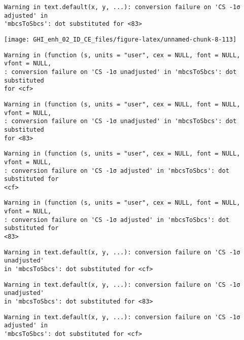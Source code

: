 \documentclass[
  10pt,
  a4paper,oneside]{article}
\begin{document}
\begin{verbatim}
Warning in text.default(x, y, ...): conversion failure on 'CS -1σ adjusted' in
'mbcsToSbcs': dot substituted for <83>
\end{verbatim}

\begin{center}\texttt{[image: GHI\_enh\_02\_ID\_CE\_files/figure-latex/unnamed-chunk-8-113]} \end{center}

\begin{verbatim}
Warning in (function (s, units = "user", cex = NULL, font = NULL, vfont = NULL,
: conversion failure on 'CS -1σ unadjusted' in 'mbcsToSbcs': dot substituted
for <cf>
\end{verbatim}

\begin{verbatim}
Warning in (function (s, units = "user", cex = NULL, font = NULL, vfont = NULL,
: conversion failure on 'CS -1σ unadjusted' in 'mbcsToSbcs': dot substituted
for <83>
\end{verbatim}

\begin{verbatim}
Warning in (function (s, units = "user", cex = NULL, font = NULL, vfont = NULL,
: conversion failure on 'CS -1σ adjusted' in 'mbcsToSbcs': dot substituted for
<cf>
\end{verbatim}

\begin{verbatim}
Warning in (function (s, units = "user", cex = NULL, font = NULL, vfont = NULL,
: conversion failure on 'CS -1σ adjusted' in 'mbcsToSbcs': dot substituted for
<83>
\end{verbatim}

\begin{verbatim}
Warning in text.default(x, y, ...): conversion failure on 'CS -1σ unadjusted'
in 'mbcsToSbcs': dot substituted for <cf>
\end{verbatim}

\begin{verbatim}
Warning in text.default(x, y, ...): conversion failure on 'CS -1σ unadjusted'
in 'mbcsToSbcs': dot substituted for <83>
\end{verbatim}

\begin{verbatim}
Warning in text.default(x, y, ...): conversion failure on 'CS -1σ adjusted' in
'mbcsToSbcs': dot substituted for <cf>
\end{verbatim}
\end{document}
